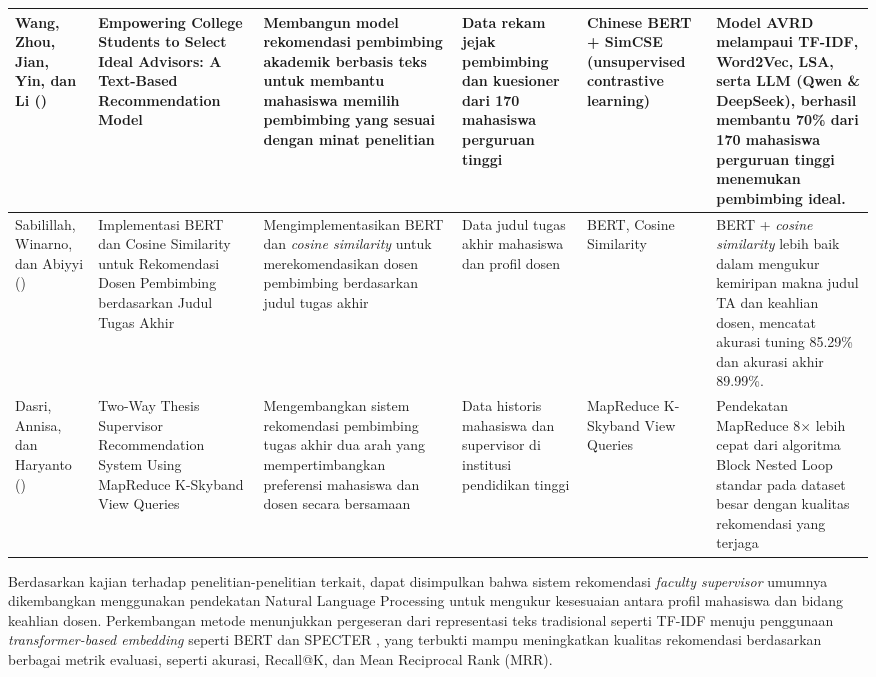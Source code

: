 \begin{longtable}[c]{|p{1.5cm}|p{2.2cm}|p{2.5cm}|p{1.8cm}|p{2cm}|p{3.2cm}|}
Wang, Zhou, Jian, Yin, dan Li (\citeyear{wang2025avrd}) & Empowering College Students to Select Ideal Advisors: A Text-Based Recommendation Model & Membangun model rekomendasi pembimbing akademik berbasis teks untuk membantu mahasiswa memilih pembimbing yang sesuai dengan minat penelitian & Data rekam jejak pembimbing dan kuesioner dari 170 mahasiswa perguruan tinggi & Chinese BERT + SimCSE (unsupervised contrastive learning) & Model AVRD melampaui TF-IDF, Word2Vec, LSA, serta LLM (Qwen \& DeepSeek), berhasil membantu 70\% dari 170 mahasiswa perguruan tinggi menemukan pembimbing ideal. \\ \hline

Sabilillah, Winarno, dan Abiyyi (\citeyear{sabilillah2024bert}) & Implementasi BERT dan Cosine Similarity untuk Rekomendasi Dosen Pembimbing berdasarkan Judul Tugas Akhir & Meng\-implemen\-tasikan BERT dan \textit{cosine similarity} untuk merekomendasikan dosen pembimbing berdasarkan judul tugas akhir & Data judul tugas akhir mahasiswa dan profil dosen & BERT, Cosine Similarity & BERT + \textit{cosine similarity} lebih baik dalam mengukur kemiripan makna judul TA dan keahlian dosen, mencatat akurasi tuning 85.29\% dan akurasi akhir 89.99\%. \\ \hline

Dasri, Annisa, dan Haryanto (\citeyear{dasri2025twoway}) & Two-Way Thesis Supervisor Recommendation System Using MapReduce K-Skyband View Queries & Mengembangkan sistem rekomendasi pembimbing tugas akhir dua arah yang mempertimbangkan preferensi mahasiswa dan dosen secara bersamaan & Data historis mahasiswa dan supervisor di institusi pendidikan tinggi & MapReduce K-Skyband View Queries & Pendekatan MapReduce 8$\times$ lebih cepat dari algoritma Block Nested Loop standar pada dataset besar dengan kualitas rekomendasi yang terjaga \\ \hline

\end{longtable}
\endgroup

Berdasarkan kajian terhadap penelitian-penelitian terkait, dapat disimpulkan bahwa sistem rekomendasi \textit{faculty supervisor} umumnya dikembangkan menggunakan pendekatan Natural Language Processing untuk mengukur kesesuaian antara profil mahasiswa dan bidang keahlian dosen. Perkembangan metode menunjukkan pergeseran dari representasi teks tradisional seperti TF-IDF \cite{dasri2025twoway} menuju penggunaan \textit{transformer-based embedding} seperti BERT \cite{sabilillah2024bert,wang2025avrd} dan SPECTER \cite{cohan2020specter}, yang terbukti mampu meningkatkan kualitas rekomendasi berdasarkan berbagai metrik evaluasi, seperti akurasi, Recall@K, dan Mean Reciprocal Rank (MRR).

